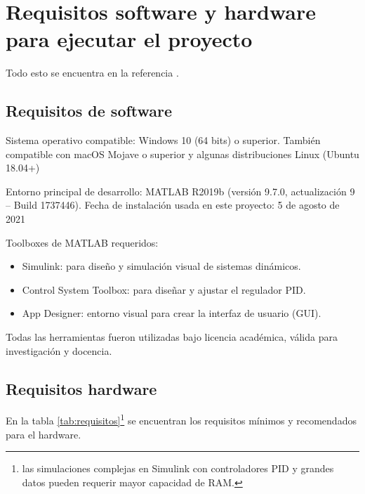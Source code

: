 
\section{Requisitos software y hardware para ejecutar el proyecto}
Todo esto se encuentra en la referencia \cite{mathworks_system_requirements_matlab}.
\subsection{Requisitos de software}
Sistema operativo compatible: Windows 10 (64 bits) o superior. También compatible con macOS Mojave o superior y algunas distribuciones Linux (Ubuntu 18.04+)

Entorno principal de desarrollo:
MATLAB R2019b (versión 9.7.0, actualización 9 – Build 1737446). Fecha de instalación usada en este proyecto: 5 de agosto de 2021

Toolboxes de MATLAB requeridos:
\begin{itemize}
    \item Simulink: para diseño y simulación visual de sistemas dinámicos.
    \item Control System Toolbox: para diseñar y ajustar el regulador PID.
    \item App Designer: entorno visual para crear la interfaz de usuario (GUI).
\end{itemize}

Todas las herramientas fueron utilizadas bajo licencia académica, válida para investigación y docencia.

\subsection{Requisitos hardware}
En la tabla \ref{tab:requisitos}\footnote{las simulaciones complejas en Simulink con controladores PID y grandes datos pueden requerir mayor capacidad de RAM.} se encuentran los requisitos mínimos y recomendados para el hardware.

